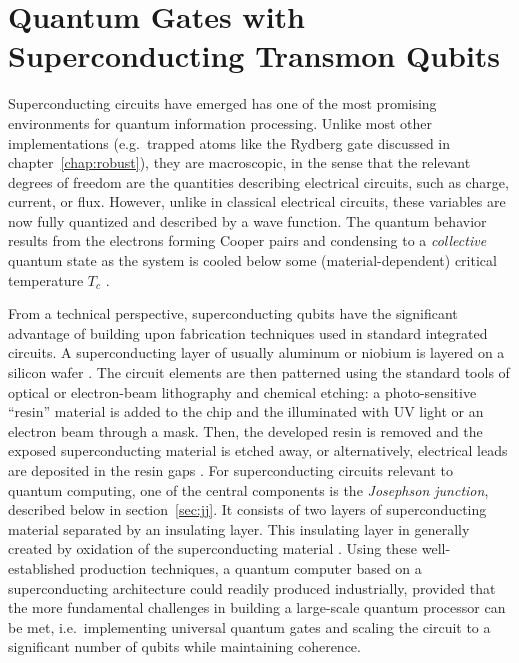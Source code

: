 \chapter{Quantum Gates with Superconducting Transmon Qubits}
\label{chap:transmon}

Superconducting circuits have emerged has one of the most promising
environments for quantum information processing. Unlike most other
implementations (e.g.\ trapped atoms like the Rydberg gate discussed in
chapter~\ref{chap:robust}), they are macroscopic, in the sense that the relevant
degrees of freedom are the quantities describing electrical circuits, such as
charge, current, or flux. However, unlike in classical electrical circuits,
these variables are now fully quantized and described by a wave function. The
quantum behavior results from the electrons forming Cooper pairs and condensing
to a \emph{collective} quantum state as the system is cooled below some
(material-dependent) critical temperature $T_c$ \cite{TinkhamBook}.

From a technical perspective, superconducting qubits have the significant
advantage of building upon fabrication techniques used in standard integrated
circuits. A superconducting layer of usually aluminum or niobium is layered on
a silicon wafer
\cite{DevoretQIP2004, FrunzioITAS2005}.
The circuit elements are then patterned using the standard tools of optical or
electron-beam lithography and chemical etching: a photo-sensitive ``resin''
material is added to the chip and the illuminated with UV light or an electron
beam through a mask. Then, the developed resin is removed and the
exposed superconducting material is etched away, or alternatively, electrical
leads are deposited in the resin gaps \cite{HirstSCHandbook2003}.
For superconducting circuits relevant to quantum computing, one of the central
components is the \emph{Josephson junction}, described below in
section~\ref{sec:jj}. It consists of two layers of superconducting material
separated by an insulating layer. This insulating layer in generally created by
oxidation of the superconducting material \cite{DevoretQIP2004,
FrunzioITAS2005}. Using these well-established production techniques,
a quantum computer based on a superconducting architecture could readily
produced industrially, provided that the more fundamental challenges in building
a large-scale quantum processor can be met, i.e.\ implementing universal quantum
gates and scaling the circuit to a significant number of qubits while
maintaining coherence.

